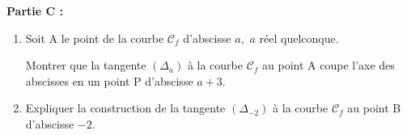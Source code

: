 \documentclass[10pt]{article}
\begin{document}
\bigskip

\textbf{Partie C :}

\medskip

\begin{enumerate}
\item Soit A le point de la courbe $\mathcal{C}_f$ d'abscisse $a$,\, $a$ réel quelconque.

Montrer que la tangente $\left(\Delta_a\right)$ à la courbe $\mathcal{C}_f$ au point A coupe l'axe des abscisses en un point P d'abscisse $a + 3$.
\item Expliquer la construction de la tangente $\left(\Delta_{-2}\right)$  à la courbe $\mathcal{C}_f$ au point B d'abscisse $- 2$.
\end{enumerate}
\end{document}
